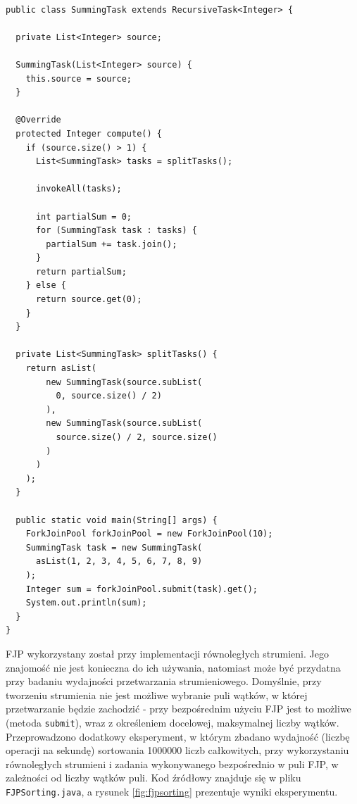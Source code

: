\documentclass[12pt]{extarticle}
\begin{document}
\begin{lstlisting}[label=fjpexample, caption=Przykładowe wykorzystanie FJP]

public class SummingTask extends RecursiveTask<Integer> {
  
  private List<Integer> source;
  
  SummingTask(List<Integer> source) {
    this.source = source;
  }
  
  @Override
  protected Integer compute() {
    if (source.size() > 1) {
      List<SummingTask> tasks = splitTasks();
      
      invokeAll(tasks);
      
      int partialSum = 0;
      for (SummingTask task : tasks) {
        partialSum += task.join();
      }
      return partialSum;
    } else {
      return source.get(0);
    }
  }
  
  private List<SummingTask> splitTasks() {
    return asList(
        new SummingTask(source.subList(
          0, source.size() / 2)
        ),
        new SummingTask(source.subList(
          source.size() / 2, source.size()
        )
      )
    );
  }
  
  public static void main(String[] args) {
    ForkJoinPool forkJoinPool = new ForkJoinPool(10);
    SummingTask task = new SummingTask(
      asList(1, 2, 3, 4, 5, 6, 7, 8, 9)
    );
    Integer sum = forkJoinPool.submit(task).get();
    System.out.println(sum);
  }
}

\end{lstlisting}

    FJP wykorzystany został przy implementacji równoległych strumieni. Jego znajomość nie jest konieczna do ich używania, natomiast może być przydatna przy badaniu wydajności przetwarzania strumieniowego. Domyślnie, przy tworzeniu strumienia nie jest możliwe wybranie puli wątków, w której przetwarzanie będzie zachodzić - przy bezpośrednim użyciu FJP jest to możliwe (metoda \texttt{submit}), wraz z określeniem docelowej, maksymalnej liczby wątków. Przeprowadzono dodatkowy eksperyment, w którym zbadano wydajność (liczbę operacji na sekundę) sortowania 1000000 liczb całkowitych, przy wykorzystaniu równoległych strumieni i zadania wykonywanego bezpośrednio w puli FJP, w zależności od liczby wątków puli. Kod źródłowy znajduje się w pliku \texttt{FJPSorting.java}, a rysunek \ref{fig:fjpsorting} prezentuje wyniki eksperymentu.
\end{document}
